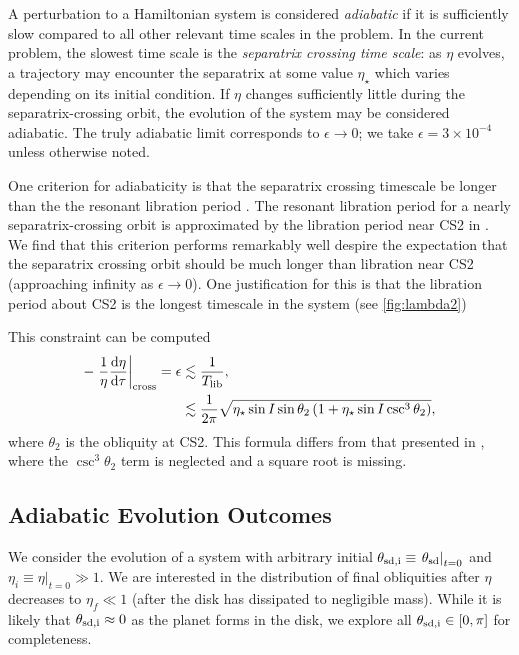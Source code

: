 \documentclass[
        fleqn,
        usenatbib,
        referee,
    ]{mnras}
\newcommand*{\rd}[2]{\frac{\mathrm{d}#1}{\mathrm{d}#2}}
\newcommand*{\at}[1]{\left.#1\right|}
\newcommand*{\p}[1]{\left(#1\right)}
\begin{document}
A perturbation to a Hamiltonian system is considered \emph{adiabatic} if it is
sufficiently slow compared to all other relevant time scales in the problem.
In the current problem, the slowest time scale is the \emph{separatrix crossing
time scale}: as $\eta$ evolves, a trajectory may encounter the separatrix at
some value $\eta_\star$ which varies depending on its initial condition. If
$\eta$ changes sufficiently little during the separatrix-crossing orbit, the
evolution of the system may be considered adiabatic. The truly adiabatic limit
corresponds to $\epsilon \to 0$; we take $\epsilon = 3 \times 10^{-4}$ unless
otherwise noted.

One criterion for adiabaticity is that the separatrix crossing timescale be
longer than the the resonant libration period \citep{ward2004II}. The resonant
libration period for a nearly separatrix-crossing orbit is approximated by
the libration period near CS2 in \citet{millholland_disk}. We find that this
criterion performs remarkably well despire the expectation that the separatrix
crossing orbit should be much longer than libration near CS2 (approaching
infinity as $\epsilon \to 0$). One justification for this is that the libration
period about CS2 is the longest timescale in the system (see
\autoref{fig:lambda2})

This constraint can be computed
\begin{align}
    -\at{\frac{1}{\eta}\rd{\eta}{\tau}}_{\rm cross} = \epsilon &\lesssim
            \frac{1}{T_{\rm lib}},\\
        &\lesssim \frac{1}{2\pi}\sqrt{\eta_\star\sin I \sin \theta_2
            \p{1 + \eta_\star \sin I \csc^3 \theta_2}},
            \label{eq:ad_constr}
\end{align}
where $\theta_2$ is the obliquity at CS2. This formula differs from that
presented in \citet{millholland_disk}, where the $\csc^3\theta_2$ term is
neglected and a square root is missing.

\subsection{Adiabatic Evolution Outcomes}\label{ss:ad_ensemble}

We consider the evolution of a system with arbitrary initial $\theta_{\rm sd, i}
\equiv \at{\theta_{\rm sd}}_{t = 0}$ and $\eta_i \equiv \at{\eta}_{t = 0} \gg
1$. We are interested in the distribution of final obliquities after $\eta$
decreases to $\eta_f \ll 1$ (after the disk has dissipated to negligible mass).
While it is likely that $\theta_{\rm sd, i} \approx 0$ as the planet forms in
the disk, we explore all $\theta_{\rm sd, i} \in [0, \pi]$ for completeness.
\end{document}
